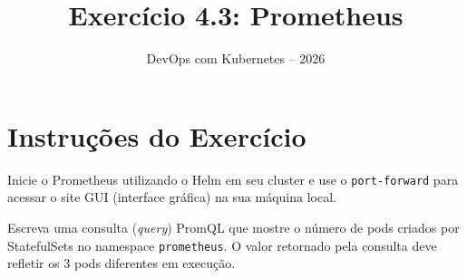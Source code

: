\documentclass[11pt,a4paper]{article}
\title{\color{secondary}\Huge\textbf{Exercício 4.3: Prometheus}}
\author{\color{primary}DevOps com Kubernetes -- 2026}
\date{}
\begin{document}
\maketitle

\section*{\color{primary}Instruções do Exercício}
\begin{tcolorbox}[colback=blue!5!white,colframe=blue!75!black,title=Exercício 4.3: Prometheus]
Inicie o Prometheus utilizando o Helm em seu cluster e use o \texttt{port-forward} para acessar o site GUI (interface gráfica) na sua máquina local.

Escreva uma consulta (\textit{query}) PromQL que mostre o número de pods criados por StatefulSets no namespace \texttt{prometheus}. O valor retornado pela consulta deve refletir os 3 pods diferentes em execução.
\end{tcolorbox}
\end{document}
